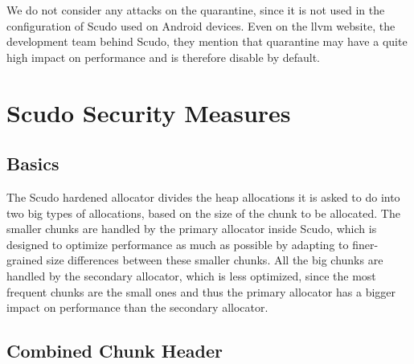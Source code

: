 \documentclass[a4paper,11pt,oneside]{report}
\begin{document}
We do not consider any attacks on the quarantine, since it is not used in the
configuration of Scudo used on Android devices. Even on the llvm website, the development
team behind Scudo, they mention that quarantine may have a quite high impact on
performance and is therefore disable by default.

\chapter{Scudo Security Measures}






\section{Basics}

The Scudo hardened allocator divides the heap allocations it is asked to do into two big
types of allocations, based on the size of the chunk to be allocated.  The smaller chunks
are handled by the primary allocator inside Scudo, which is designed to optimize
performance as much as possible by adapting to finer-grained size differences between
these smaller chunks. All the big chunks are handled by the secondary allocator, which is
less optimized, since the most frequent chunks are the small ones and thus the primary
allocator has a bigger impact on performance than the secondary allocator.

\section{Combined Chunk Header}
\end{document}
